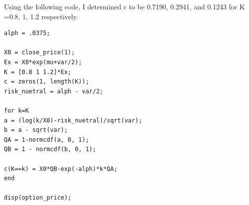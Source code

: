 \documentclass[]{article}
\begin{document}
Using the following code, I determined c to be 0.7190, 0.2941, and 0.1243 for K =0.8, 1, 1.2 respectively.

\begin{lstlisting}
alph = .0375;

X0 = close_price(1);
Ex = X0*exp(mu+var/2);
K = [0.8 1 1.2]*Ex;
c = zeros(1, length(K));
risk_nuetral = alph - var/2;

for k=K
a = (log(k/X0)-risk_nuetral)/sqrt(var);
b = a - sqrt(var);
QA = 1-normcdf(a, 0, 1);
QB = 1 - normcdf(b, 0, 1);

c(K==k) = X0*QB-exp(-alph)*k*QA;
end

disp(option_price);
\end{lstlisting}
\end{document}
